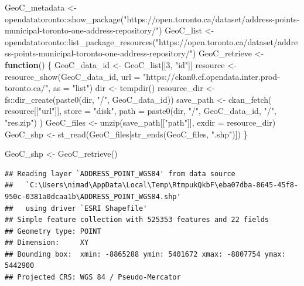 \documentclass[
]{article}
\newenvironment{Shaded}{\begin{snugshade}}{\end{snugshade}}
\newcommand{\AttributeTok}[1]{\textcolor[rgb]{0.77,0.63,0.00}{#1}}
\newcommand{\ControlFlowTok}[1]{\textcolor[rgb]{0.13,0.29,0.53}{\textbf{#1}}}
\newcommand{\DecValTok}[1]{\textcolor[rgb]{0.00,0.00,0.81}{#1}}
\newcommand{\FunctionTok}[1]{\textcolor[rgb]{0.00,0.00,0.00}{#1}}
\newcommand{\NormalTok}[1]{#1}
\newcommand{\OtherTok}[1]{\textcolor[rgb]{0.56,0.35,0.01}{#1}}
\newcommand{\SpecialCharTok}[1]{\textcolor[rgb]{0.00,0.00,0.00}{#1}}
\newcommand{\StringTok}[1]{\textcolor[rgb]{0.31,0.60,0.02}{#1}}
\begin{document}
\begin{Shaded}
\begin{Highlighting}[]
\NormalTok{GeoC\_metadata }\OtherTok{\textless{}{-}}\NormalTok{ opendatatoronto}\SpecialCharTok{::}\FunctionTok{show\_package}\NormalTok{(}\StringTok{"https://open.toronto.ca/dataset/address{-}points{-}municipal{-}toronto{-}one{-}address{-}repository/"}\NormalTok{)}
\NormalTok{GeoC\_list }\OtherTok{\textless{}{-}}\NormalTok{ opendatatoronto}\SpecialCharTok{::}\FunctionTok{list\_package\_resources}\NormalTok{(}\StringTok{"https://open.toronto.ca/dataset/address{-}points{-}municipal{-}toronto{-}one{-}address{-}repository/"}\NormalTok{)}
\NormalTok{GeoC\_retrieve }\OtherTok{\textless{}{-}} \ControlFlowTok{function}\NormalTok{() \{}
\NormalTok{  GeoC\_data\_id }\OtherTok{\textless{}{-}}\NormalTok{ GeoC\_list[[}\DecValTok{3}\NormalTok{, }\StringTok{"id"}\NormalTok{]]}
\NormalTok{  resource }\OtherTok{\textless{}{-}}
    \FunctionTok{resource\_show}\NormalTok{(GeoC\_data\_id, }\AttributeTok{url =} \StringTok{"https://ckan0.cf.opendata.inter.prod{-}toronto.ca/"}\NormalTok{, }\AttributeTok{as =} \StringTok{"list"}\NormalTok{)}
\NormalTok{  dir }\OtherTok{\textless{}{-}} \FunctionTok{tempdir}\NormalTok{()}
\NormalTok{  resource\_dir }\OtherTok{\textless{}{-}}\NormalTok{ fs}\SpecialCharTok{::}\FunctionTok{dir\_create}\NormalTok{(}\FunctionTok{paste0}\NormalTok{(dir, }\StringTok{"/"}\NormalTok{, GeoC\_data\_id))}
\NormalTok{  save\_path }\OtherTok{\textless{}{-}}
    \FunctionTok{ckan\_fetch}\NormalTok{(}
\NormalTok{      resource[[}\StringTok{"url"}\NormalTok{]],}
      \AttributeTok{store =} \StringTok{"disk"}\NormalTok{,}
      \AttributeTok{path =} \FunctionTok{paste0}\NormalTok{(dir, }\StringTok{"/"}\NormalTok{, GeoC\_data\_id, }\StringTok{"/"}\NormalTok{, }\StringTok{"res.zip"}\NormalTok{)}
\NormalTok{    )}
\NormalTok{  GeoC\_files }\OtherTok{\textless{}{-}} \FunctionTok{unzip}\NormalTok{(save\_path[[}\StringTok{"path"}\NormalTok{]], }\AttributeTok{exdir =}\NormalTok{ resource\_dir)}
\NormalTok{  GeoC\_shp }\OtherTok{\textless{}{-}} \FunctionTok{st\_read}\NormalTok{(GeoC\_files[}\FunctionTok{str\_ends}\NormalTok{(GeoC\_files, }\StringTok{".shp"}\NormalTok{)])}
\NormalTok{\}}

\NormalTok{GeoC\_shp }\OtherTok{\textless{}{-}} \FunctionTok{GeoC\_retrieve}\NormalTok{()}
\end{Highlighting}
\end{Shaded}

\begin{verbatim}
## Reading layer `ADDRESS_POINT_WGS84' from data source 
##   `C:\Users\nimad\AppData\Local\Temp\RtmpukQkbF\eba07dba-8645-45f8-950c-0381a0dcaa1b\ADDRESS_POINT_WGS84.shp' 
##   using driver `ESRI Shapefile'
## Simple feature collection with 525353 features and 22 fields
## Geometry type: POINT
## Dimension:     XY
## Bounding box:  xmin: -8865288 ymin: 5401672 xmax: -8807754 ymax: 5442900
## Projected CRS: WGS 84 / Pseudo-Mercator
\end{verbatim}
\end{document}
